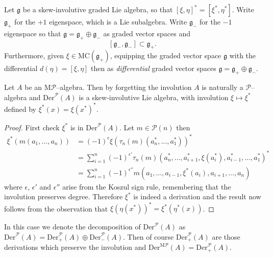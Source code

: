 \documentclass[british]{amsart}
\theoremstyle{plain}
\theoremstyle{definition}
{
\newaliascnt{{definition}}{theorem}\newtheorem{{definition}}[{definition}]{{Definition}}\aliascntresetthe{{definition}}\expandafterautorefname\endcsname{{Definition}}}
{
\newaliascnt{{remark}}{theorem}\newtheorem{{remark}}[{remark}]{{Remark}}\aliascntresetthe{{remark}}\expandafterautorefname\endcsname{{Remark}}}
{
\newaliascnt{{example}}{theorem}\newtheorem{{example}}[{example}]{{Example}}\aliascntresetthe{{example}}\expandafterautorefname\endcsname{{Example}}}
{
\newaliascnt{{examples}}{theorem}\newtheorem{{examples}}[{examples}]{{Examples}}\aliascntresetthe{{examples}}\expandafterautorefname\endcsname{{Examples}}}
{
\newaliascnt{{notation}}{theorem}\newtheorem{{notation}}[{notation}]{{Notation}}\aliascntresetthe{{notation}}\expandafterautorefname\endcsname{{Notation}}}
{
\newaliascnt{{convention}}{theorem}\newtheorem{{convention}}[{convention}]{{Convention}}\aliascntresetthe{{convention}}\expandafterautorefname\endcsname{{Convention}}}
\numberwithin{equation}{section}
\numberwithin{figure}{section}
\begin{document}
Let $\mathfrak{g}$ be a skew-involutive graded Lie algebra, so that $[\xi,\eta]^* = [\xi^*,\eta^*]$. Write $\mathfrak{g}_+$ for the $+1$ eigenspace, which is a Lie subalgebra. Write $\mathfrak{g}_-$ for the $-1$ eigenspace so that $\mathfrak{g}=\mathfrak{g}_+\oplus \mathfrak{g}_-$ as graded vector spaces and
\[
[\mathfrak{g}_-,\mathfrak{g}_-]\subset \mathfrak{g}_+.
\]
Furthermore, given $\xi\in{\mathrm{MC}}(\mathfrak{g}_+)$, equipping the graded vector space $\mathfrak{g}$ with the differential $d(\eta) = [\xi,\eta]$ then as \emph{differential} graded vector spaces $\mathfrak{g} = \mathfrak{g}_+ \oplus \mathfrak{g}_-$.

\begin{proposition}
Let $A$ be an ${\mathrm{M}}\mathcal{P}$--algebra. Then by forgetting the involution $A$ is naturally a $\mathcal{P}$--algebra and ${\mathrm{Der}}^{\mathcal{P}}(A)$ is a skew-involutive Lie algebra, with involution $\xi\mapsto \xi^*$ defined by $\xi^*(x) = \xi(x^*)^*$.
\end{proposition}

\begin{proof}
First check $\xi^*$ is in ${\mathrm{Der}}^\mathcal{P}(A)$. Let $m\in\mathcal{P}(n)$ then
\begin{align*}
\xi^*(m(a_1, \dots, a_n )) 
&= (-1)^\epsilon\xi(\tau_n(m)(a_n^*,\dots, a_1^*))^*\\
&= \sum_{i=1}^n (-1)^{\epsilon'} \tau_n(m)(a_n^*, \dots, a_{i+1}^*, \xi(a_i^*), a_{i-1}^*, \dots, a_1^*)^*\\
&= \sum_{i=1}^n (-1)^{\epsilon''} m(a_1, \dots, a_{i-1}, \xi^*(a_i), a_{i+1}, \dots, a_n)
\end{align*}
where $\epsilon$, $\epsilon'$ and $\epsilon''$ arise from the Koszul sign rule, remembering that the involution preserves degree. Therefore $\xi^*$ is indeed a derivation and the result now follows from the observation that $\xi(\eta(x^*))^* = \xi^*(\eta^*(x))$.
\end{proof}

\begin{remark}\label{rem:mobderpreservesinv}
In this case we denote the decomposition of ${\mathrm{Der}}^\mathcal{P}(A)$ as ${\mathrm{Der}}^{\mathcal{P}}(A)={\mathrm{Der}}_+^\mathcal{P}(A)\oplus {\mathrm{Der}}_-^\mathcal{P}(A)$. Then of course ${\mathrm{Der}}_+^\mathcal{P}(A)$ are those derivations which preserve the involution and ${\mathrm{Der}}^{{\mathrm{M}}\mathcal{P}}(A)={\mathrm{Der}}^{\mathcal{P}}_+(A)$.
\end{remark}
\end{document}
